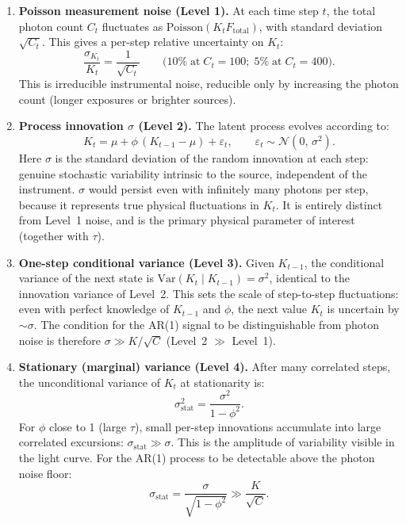 \documentclass[11pt, a4paper]{article}
\begin{document}
\begin{enumerate}[leftmargin=*, itemsep=8pt]

\item \textbf{Poisson measurement noise (Level 1).}
At each time step $t$, the total photon count $C_t$ fluctuates as
$\mathrm{Poisson}(K_t F_\mathrm{total})$, with standard deviation $\sqrt{C_t}$.
This gives a per-step relative uncertainty on $K_t$:
\begin{equation}
    \frac{\sigma_{K_t}}{K_t} = \frac{1}{\sqrt{C_t}}
    \qquad\bigl(10\%\;\text{at}\;C_t = 100;\;5\%\;\text{at}\;C_t = 400\bigr).
\end{equation}
This is irreducible instrumental noise, reducible only by increasing the photon count
(longer exposures or brighter sources).

\item \textbf{Process innovation $\sigma$ (Level 2).}
The latent process evolves according to:
\begin{equation}
    K_t = \mu + \phi\,(K_{t-1} - \mu) + \varepsilon_t,
    \qquad \varepsilon_t \sim \mathcal{N}(0,\,\sigma^2).
\end{equation}
Here $\sigma$ is the standard deviation of the random innovation at each step:
genuine stochastic variability intrinsic to the source, independent of the instrument.
$\sigma$ would persist even with infinitely many photons per step, because it
represents true physical fluctuations in $K_t$.
It is entirely distinct from Level~1 noise, and is the primary physical parameter
of interest (together with $\tau$).

\item \textbf{One-step conditional variance (Level 3).}
Given $K_{t-1}$, the conditional variance of the next state is
$\mathrm{Var}(K_t \mid K_{t-1}) = \sigma^2$,
identical to the innovation variance of Level~2.
This sets the scale of step-to-step fluctuations: even with perfect knowledge of
$K_{t-1}$ and $\phi$, the next value $K_t$ is uncertain by $\sim\!\sigma$.
The condition for the AR(1) signal to be distinguishable from photon noise is
therefore $\sigma \gg K/\sqrt{C}$ (Level~2 $\gg$ Level~1).

\item \textbf{Stationary (marginal) variance (Level 4).}
After many correlated steps, the unconditional variance of $K_t$ at stationarity is:
\begin{equation}
    \sigma_\mathrm{stat}^2 = \frac{\sigma^2}{1 - \phi^2}.
    \label{eq:sigma_stat}
\end{equation}
For $\phi$ close to 1 (large $\tau$), small per-step innovations accumulate into large
correlated excursions: $\sigma_\mathrm{stat} \gg \sigma$.
This is the amplitude of variability visible in the light curve.
For the AR(1) process to be detectable above the photon noise floor:
\begin{equation}
    \sigma_\mathrm{stat} = \frac{\sigma}{\sqrt{1-\phi^2}} \gg \frac{K}{\sqrt{C}}.
    \label{eq:detectability_cond}
\end{equation}

\end{enumerate}
\end{document}
